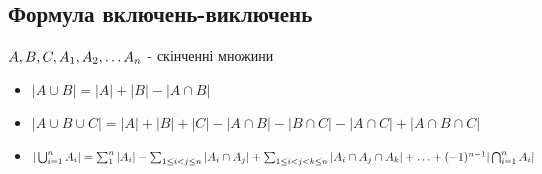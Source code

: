 \documentclass{article}
\begin{document}
\subsection*{Формула включень-виключень}
$A, B, C, A_1, A_2, \mathellipsis A_n$ - скінченні множини
\begin{itemize}
    \item $|A \cup B| = |A| + |B| - |A \cap B|$
    \item $|A \cup B \cup C| = |A| + |B| + |C| - |A \cap B| - |B \cap C| - |A \cap C| + |A \cap B \cap C|$
    \item $|\bigcup_{i=1}^{n}A_i| = \sum_{1}^{n}|A_i| - \sum_{1 \leq i < j \leq n}|A_i \cap A_j| +
    \sum_{1 \leq i < j < k \leq n}|A_i \cap A_j \cap A_k| + \mathellipsis + (-1)^{n-1}|\bigcap_{i=1}^n A_i|$
\end{itemize}
\end{document}
